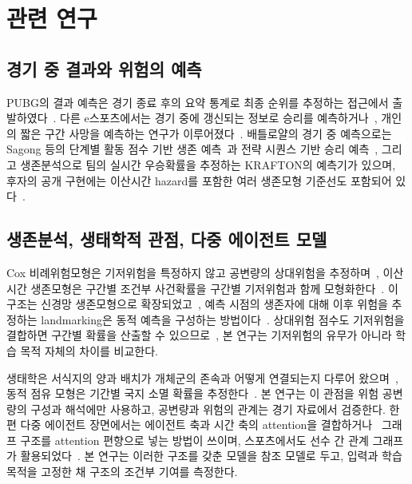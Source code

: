 \section{관련 연구}
\label{sec:related}

\subsection{경기 중 결과와 위험의 예측}
\label{sec:related:esports}

PUBG의 결과 예측은 경기 종료 후의 요약 통계로 최종 순위를 추정하는 접근에서 출발하였다~\cite{KagglePUBG,LeeLee25}.
다른 e스포츠에서는 경기 중에 갱신되는 정보로 승리를 예측하거나~\cite{Hodge21}, 개인의 짧은 구간 사망을 예측하는 연구가 이루어졌다~\cite{Katona19}.
배틀로얄의 경기 중 예측으로는 Sagong 등의 단계별 활동 점수 기반 생존 예측~\cite{Sagong25a}과 전략 시퀀스 기반 승리 예측~\cite{Sagong25b}, 그리고 생존분석으로 팀의 실시간 우승확률을 추정하는 KRAFTON의 예측기가 있으며, 후자의 공개 구현에는 이산시간 hazard를 포함한 여러 생존모형 기준선도 포함되어 있다~\cite{KRAFTON}.

\subsection{생존분석, 생태학적 관점, 다중 에이전트 모델}
\label{sec:related:survival}

Cox 비례위험모형은 기저위험을 특정하지 않고 공변량의 상대위험을 추정하며~\cite{Cox72}, 이산시간 생존모형은 구간별 조건부 사건확률을 구간별 기저위험과 함께 모형화한다~\cite{SingerWillett93}.
이 구조는 신경망 생존모형으로 확장되었고~\cite{Gensheimer19}, 예측 시점의 생존자에 대해 이후 위험을 추정하는 landmarking은 동적 예측을 구성하는 방법이다~\cite{vanHouwelingen07}.
상대위험 점수도 기저위험을 결합하면 구간별 확률을 산출할 수 있으므로~\cite{PrenticeGloeckler78}, 본 연구는 기저위험의 유무가 아니라 학습 목적 자체의 차이를 비교한다.

생태학은 서식지의 양과 배치가 개체군의 존속과 어떻게 연결되는지 다루어 왔으며~\cite{Fahrig03}, 동적 점유 모형은 기간별 국지 소멸 확률을 추정한다~\cite{MacKenzie03}.
본 연구는 이 관점을 위험 공변량의 구성과 해석에만 사용하고, 공변량과 위험의 관계는 경기 자료에서 검증한다.
한편 다중 에이전트 장면에서는 에이전트 축과 시간 축의 attention을 결합하거나~\cite{Ngiam22} 그래프 구조를 attention 편향으로 넣는 방법이 쓰이며, 스포츠에서도 선수 간 관계 그래프가 활용되었다~\cite{Ying21,Xenopoulos21}.
본 연구는 이러한 구조를 갖춘 모델을 참조 모델로 두고, 입력과 학습 목적을 고정한 채 구조의 조건부 기여를 측정한다.
